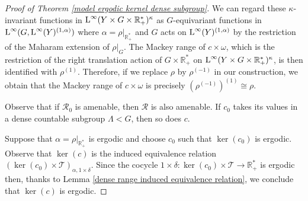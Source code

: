 \documentclass[10pt,a4paper]{amsart}
\newcommand{\R}{\mathbb{R}}
\newcommand{\cR}{\mathcal{R}}
\newcommand{\cT}{\mathcal{T}}
\newcommand{\rL}{\mathord{\text{\rm L}}}
\begin{document}
\begin{proof}[Proof of Theorem \ref{model ergodic kernel dense subgroup}]
     We can regard these $\kappa$-invariant functions in $\rL^\infty(Y \times G \times \R^*_+)^{\kappa}$ as $G$-equivariant functions in $\rL^\infty(G, \rL^\infty(Y)^{(1,\alpha)})$ where $\alpha=\rho|_{\R^*_+}$ and $G$ acts on $\rL^\infty(Y)^{(1,\alpha)}$ by the restriction of the Maharam extension of $\rho|_G$. The Mackey range of $c \times \omega$, which is the restriction of the right translation action of $G \times \R^*_+$ on $\rL^\infty(Y \times G \times \R^*_+)^{\kappa}$, is then identified with $\rho^{(1)}$. Therefore, if we replace $\rho$ by $\rho^{(-1)}$ in our construction, we obtain that the Mackey range of $c \times \omega$ is precisely $(\rho^{(-1)})^{(1)} \cong \rho$.

    Observe that if  $\cR_0$ is amenable, then $\cR$ is also amenable. If $c_0$ takes its values in a dense countable subgroup $\Lambda < G$, then so does $c$. 

    Suppose that $\alpha=\rho|_{\R^*_+}$ is ergodic and choose $c_0$ such that $\ker(c_0)$ is ergodic. Observe that $\ker(c)$ is the induced equivalence relation $(\ker(c_0) \times \cT)_{\alpha,1 \times \delta}$.
     Since the cocycle $1 \times \delta  : \ker(c_0) \times \cT \rightarrow \R^*_+$ is ergodic then, thanks to Lemma \ref{dense range induced equivalence relation}, we conclude that $\ker(c)$ is ergodic.
\end{proof}
\end{document}
